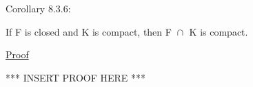 { \color{orange} Corollary 8.3.6: } 

	\begin{adjustbox}{minipage=14cm, right, vspace=0.1cm 0cm}
		If F is closed and K is compact, then F $\cap_{}^{}$ K is compact.
	\end{adjustbox}

{ \color{magenta} \underline{Proof} } 

	*** INSERT PROOF HERE *** \\































\subsection{}    
